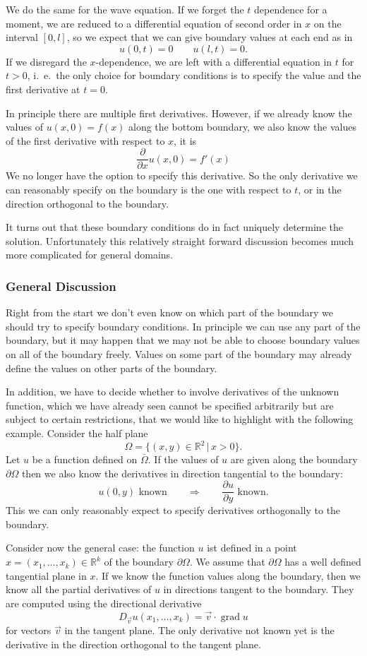 We do the same for the wave equation.
If we forget the $t$ dependence for a moment, we are reduced to a
differential equation of second order in $x$ on the interval $[0,l]$,
so we expect that we can give boundary values at each end
as in
\[
u(0,t)=0\qquad u(l,t)=0.
\]
If we disregard the $x$-dependence, we are left with a differential equation
in $t$ for $t>0$, i.~e.~the only choice for boundary conditions is to
specify the value and the first derivative at $t=0$.

In principle there are multiple first derivatives.
However, if we already know the values of $u(x,0)=f(x)$ along the bottom
boundary, we
also know the values of the first derivative with respect to $x$, it is
\[
\frac{\partial }{\partial x}u(x,0) = f'(x)
\]
We no longer have the option to specify this derivative.
So the only derivative we can reasonably specify on the boundary
is the one with respect to $t$, or in the direction
orthogonal to the boundary.

It turns out that these boundary conditions do in fact uniquely
determine the solution.
Unfortunately this relatively straight forward discussion becomes
much more complicated for general domains.

\subsubsection{General Discussion}
Right from the start we don't even know on which part of the boundary
we should try to specify boundary conditions.
In principle we can use any part of the boundary, but it may happen
that we may not be able to choose boundary values on all of the boundary
freely.
Values on some part of the boundary may already define the values on
other parts of the boundary.

In addition, we have to decide whether to involve derivatives of the
unknown function, which we have already seen cannot be specified
arbitrarily but are subject to certain restrictions, that we would like
to highlight with the following example.
Consider the half plane
\[
\Omega=\{(x,y)\in\mathbb R^2\,|\,x>0\}.
\]
Let $u$ be a function defined on $\bar\Omega$.
If the values of $u$ are given along the boundary $\partial\Omega$
then we also know the derivatives in direction tangential to the boundary:
\[
\text{
$u(0,y)$ known
}\qquad\Rightarrow\qquad
\text{$\frac{\partial u}{\partial y}$ known.}
\]
This we can only reasonably expect to specify derivatives orthogonally
to the boundary.

Consider now the general case: the function $u$ ist defined in a point 
$x=(x_1,\dots,x_k)\in\mathbb R^k$ of the boundary $\partial\Omega$.
We assume that $\partial \Omega$ has a well defined tangential plane
in $x$.
If we know the function values along the boundary, then we know all the
partial derivatives of $u$ in directions tangent to the boundary.
They are computed using the directional derivative
\[
D_{\vec v}u(x_1,\dots,x_k)=\vec v\cdot\operatorname{grad}u
\]
for vectors $\vec{v}$ in the tangent plane.
The only derivative not known yet is the derivative in the direction
orthogonal to the tangent plane.

